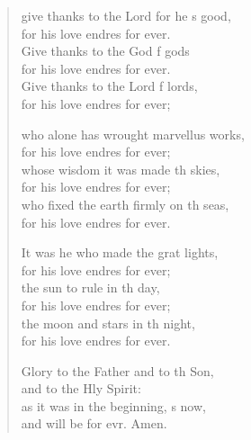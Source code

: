 \settowidth{\versewidth}{O give thanks to the Lord for he is good, *}
\begin{verse}%
  \begin{patverse}
 give thanks to the Lord for he \pointup{\i}s good,\Med\\
    for his love endres for ever.\\
Give thanks to the God f gods\Med\\
    for his love endres for ever.\\
Give thanks to the Lord f lords,\Med\\
    for his love endres for ever;

who alone has wrought marvellus works,\Med\\
    for his love endres for ever;\\
whose wisdom it was made th skies,\Med\\
    for his love endres for ever;\\
who fixed the earth firmly on th seas,\Med\\
    for his love endres for ever.

It was he who made the grat lights,\Med\\
    for his love endres for ever;\\
the sun to rule in th day,\Med\\
    for his love endres for ever;\\
the moon and stars in th night,\Med\\
    for his love endres for ever.

Glory to the Father and to th Son,\Med\\
    and to the Hly Spirit:\\
as it was in the beginning, \pointup{\i}s now,\Med\\
    and will be for evr. Amen.
  \end{patverse}
\end{verse}
